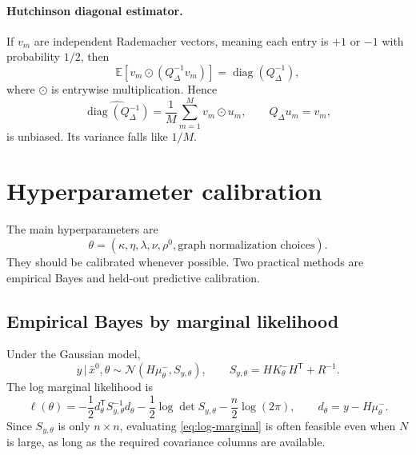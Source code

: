 \documentclass[11pt]{article}
\numberwithin{equation}{section}
\newcommand{\E}{\mathbb{E}}
\newcommand{\diag}{\operatorname{diag}}
\newcommand{\transpose}{^{\mathsf T}}
\newcommand{\given}{\,|\,}
\newcommand{\half}{\frac{1}{2}}
\begin{document}
\paragraph{Hutchinson diagonal estimator.}  If $v_m$ are independent Rademacher vectors, meaning each entry is $+1$ or $-1$ with probability $1/2$, then
\begin{equation}
  \E[v_m\odot(Q_\Delta^{-1}v_m)]=\diag(Q_\Delta^{-1}),
  \label{eq:hutchinson-unbiased}
\end{equation}
where $\odot$ is entrywise multiplication.  Hence
\begin{equation}
  \widehat{\diag(Q_\Delta^{-1})}
  =\frac1M\sum_{m=1}^M v_m\odot u_m,
  \qquad
  Q_\Delta u_m=v_m,
  \label{eq:hutchinson-estimator}
\end{equation}
is unbiased.  Its variance falls like $1/M$.

\section{Hyperparameter calibration}
\label{sec:calibration}

The main hyperparameters are
\begin{equation}
  \theta=(\kappa,\eta,\lambda,\nu,\rho^0,\text{graph normalization choices}).
  \label{eq:theta}
\end{equation}
They should be calibrated whenever possible.  Two practical methods are empirical Bayes and held-out predictive calibration.

\subsection{Empirical Bayes by marginal likelihood}

Under the Gaussian model,
\begin{equation}
  y\given\bar x^0,\theta
  \sim\mathcal N(H\mu^-_\theta,S_{y,\theta}),
  \qquad
  S_{y,\theta}=HK^-_\theta H\transpose+R^{-1}.
  \label{eq:marginal-y}
\end{equation}
The log marginal likelihood is
\begin{equation}
  \ell(\theta)
  =-\half d_\theta\transpose S_{y,\theta}^{-1}d_\theta
   -\half\log\det S_{y,\theta}
   -\frac n2\log(2\pi),
  \qquad
  d_\theta=y-H\mu^-_\theta.
  \label{eq:log-marginal}
\end{equation}
Since $S_{y,\theta}$ is only $n\times n$, evaluating \eqref{eq:log-marginal} is often feasible even when $N$ is large, as long as the required covariance columns are available.
\end{document}
